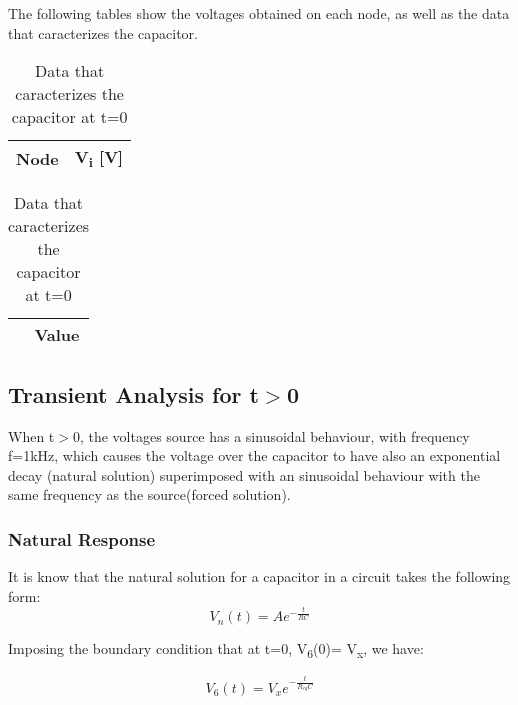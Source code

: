 The following tables show the voltages obtained on each node, as well as the data that caracterizes the capacitor.

\begin{table}[!htb]
    \begin{minipage}{.5\linewidth}
      
      \centering
        \begin{tabular}{|c|c|}
        \hline    
        {\bf Node} & {\bf V\textsubscript{i} [V]} \\ \hline
        
        \end{tabular}
        \caption{Voltage values on each node (t=0)}
    \end{minipage}%
    \begin{minipage}{.5\linewidth}
      \centering
        
        \begin{tabular}{|c|c|}
        \hline    
        {\bf } & {\bf Value} \\ \hline
        
        \end{tabular}
        \caption{Data that caracterizes the capacitor at t=0}
    \end{minipage} 
\end{table}
\newpage

\subsection{Transient Analysis for t$>$0}

When t$>$0, the voltages source has a sinusoidal behaviour, with frequency f=1kHz, which causes the voltage over the capacitor to have also an exponential decay (natural solution) superimposed with an sinusoidal behaviour with the same frequency as the source(forced solution).

\subsubsection{Natural Response}
It is know that the natural solution for a capacitor in a circuit takes the following form:
\begin{equation}
 V_n(t)=A e^{- \frac{t}{RC}}
\end{equation}

Imposing the boundary condition that at t=0, V\textsubscript{6}(0)= V\textsubscript x, we have:

\begin{equation}
 V_6(t)=V_x e^{- \frac{t}{R_{eq} C}}
\end{equation}

